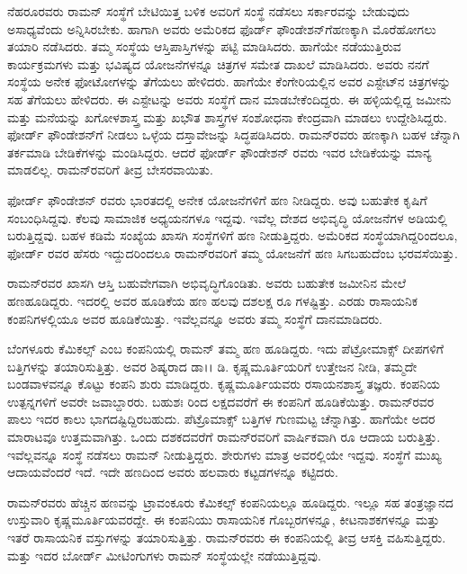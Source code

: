 \vskip 2pt

ನೆಹರೂರವರು ರಾಮನ್ ಸಂಸ್ಥೆಗೆ ಬೇಟಿಯಿತ್ತ ಬಳಿಕ ಅವರಿಗೆ ಸಂಸ್ಥೆ ನಡೆಸಲು ಸರ್ಕಾರವನ್ನು ಬೇಡುವುದು ಅಸಾಧ್ಯವೆಂದು ಅನ್ನಿಸಿರಬೇಕು. ಹಾಗಾಗಿ ಅವರು ಅಮೆರಿಕದ ಫೊರ್ಡ್ ಫೌಂಡೇಶನ್‌ಗೆ\break ಹಣಕ್ಕಾಗಿ ಮೊರೆಹೋಗಲು ತಯಾರಿ ನಡೆಸಿದರು. ತಮ್ಮ ಸಂಸ್ಥೆಯ ಆಸ್ತಿಪಾಸ್ತಿಗಳನ್ನು ಪಟ್ಟಿ ಮಾಡಿಸಿದರು. ಹಾಗೆಯೇ ನಡೆಯುತ್ತಿರುವ ಕಾರ್ಯಕ್ರಮಗಳು ಮತ್ತು ಭವಿಷ್ಯದ ಯೋಜನೆಗಳನ್ನೂ ಚಿತ್ರಗಳ ಸಮೇತ ದಾಖಲೆ ಮಾಡಿಸಿದರು. ಅವರು ನನಗೆ ಸಂಸ್ಥೆಯ ಅನೇಕ ಫೋಟೋಗಳನ್ನು ತೆಗೆಯಲು ಹೇಳಿದರು. ಹಾಗೆಯೇ ಕೆಂಗೇರಿಯಲ್ಲಿನ ಅವರ ಎಸ್ಟೇಟ್‍ನ ಚಿತ್ರಗಳನ್ನು ಸಹ ತೆಗೆಯಲು ಹೇಳಿದರು. ಈ ಎಸ್ಟೇಟನ್ನು ಅವರು ಸಂಸ್ಥೆಗೆ ದಾನ ಮಾಡಬೇಕೆಂದಿದ್ದರು. ಈ ಹಳ್ಳಿಯಲ್ಲಿದ್ದ ಜಮೀನು ಮತ್ತು ಮನೆಯನ್ನು ಖಗೋಳಶಾಸ್ತ್ರ ಮತ್ತು ಖಭೌತ ಶಾಸ್ತ್ರಗಳ ಸಂಶೋಧನಾ ಕೇಂದ್ರವಾಗಿ ಮಾಡಲು ಉದ್ದೇಶಿಸಿದ್ದರು. ಫೋರ್ಡ್ ಫೌಂಡೇಶನ್‍ಗೆ ನೀಡಲು ಒಳ್ಳೆಯ ದಸ್ತಾವೇಜನ್ನು ಸಿದ್ಧಪಡಿಸಿದರು. ರಾಮನ್‍ರವರು ಹಣಕ್ಕಾಗಿ ಬಹಳ ಚೆನ್ನಾಗಿ ತರ್ಕಮಾಡಿ ಬೇಡಿಕೆಗಳನ್ನು ಮಂಡಿಸಿದ್ದರು. ಆದರೆ ಫೋರ್ಡ್ ಫೌಂಡೇಶನ್ ರವರು ಇವರ ಬೇಡಿಕೆಯನ್ನು ಮಾನ್ಯ ಮಾಡಲಿಲ್ಲ. ರಾಮನ್‍ರವರಿಗೆ ತೀವ್ರ ಬೇಸರವಾಯಿತು.

\vskip 2pt

ಫೋರ್ಡ್ ಫೌಂಡೇಶನ್ ರವರು ಭಾರತದಲ್ಲಿ ಅನೇಕ ಯೋಜನೆಗಳಿಗೆ ಹಣ ನೀಡಿದ್ದರು. ಅವು ಬಹುತೇಕ ಕೃಷಿಗೆ ಸಂಬಂಧಿಸಿದ್ದವು. ಕೆಲವು ಸಾಮಾಜಿಕ ಅಧ್ಯಯನಗಳೂ ಇದ್ದವು. ಇವೆಲ್ಲ ದೇಶದ ಅಭಿವೃದ್ಧಿ ಯೋಜನೆಗಳ ಅಡಿಯಲ್ಲಿ ಬರುತ್ತಿದ್ದವು. ಬಹಳ ಕಡಿಮೆ ಸಂಖ್ಯೆಯ ಖಾಸಗಿ ಸಂಸ್ಥೆಗಳಿಗೆ ಹಣ ನೀಡುತ್ತಿದ್ದರು. ಅಮೆರಿಕದ ಸಂಸ್ಥೆಯಾಗಿದ್ದರಿಂದಲೂ, ಫೋರ್ಡ್ ರವರ ಹೆಸರು ಇದ್ದುದರಿಂದಲೂ ರಾಮನ್‍ರವರಿಗೆ ತಮ್ಮ ಯೋಜನೆಗೆ ಹಣ ಸಿಗಬಹುದೆಂಬ ಭರವಸೆಯಿತ್ತು.

ರಾಮನ್‍ರವರ ಖಾಸಗಿ ಆಸ್ತಿ ಬಹುವೇಗವಾಗಿ ಅಭಿವೃದ್ಧಿಗೊಂಡಿತು. ಅವರು ಬಹುತೇಕ ಜಮೀನಿನ ಮೇಲೆ ಹಣಹೂಡಿದ್ದರು. ಇದರಲ್ಲಿ ಅವರ ಹೂಡಿಕೆಯ ಹಣ ಹಲವು ದಶಲಕ್ಷ ರೂ ಗಳಷ್ಟಿತ್ತು. ಎರಡು ರಾಸಾಯನಿಕ ಕಂಪನಿಗಳಲ್ಲಿಯೂ ಅವರ ಹೂಡಿಕೆಯಿತ್ತು. ಇವೆಲ್ಲವನ್ನೂ ಅವರು ತಮ್ಮ ಸಂಸ್ಥೆಗೆ ದಾನಮಾಡಿದರು.

ಬೆಂಗಳೂರು ಕೆಮಿಕಲ್ಸ್ ಎಂಬ ಕಂಪನಿಯಲ್ಲಿ ರಾಮನ್ ತಮ್ಮ ಹಣ ಹೂಡಿದ್ದರು. ಇದು ಪೆಟ್ರೋಮಾಕ್ಸ್ ದೀಪಗಳಿಗೆ ಬತ್ತಿಗಳನ್ನು ತಯಾರಿಸುತ್ತಿತ್ತು. ಅವರ ಶಿಷ್ಯರಾದ ಡಾ।। ಡಿ. ಕೃಷ್ಣಮೂರ್ತಿ\break ಯರಿಗೆ ಉತ್ತೇಜನ ನೀಡಿ, ತಮ್ಮದೇ ಬಂಡವಾಳವನ್ನೂ ಕೊಟ್ಟು ಕಂಪನಿ ಶುರು ಮಾಡಿದ್ದರು. ಕೃಷ್ಣಮೂರ್ತಿ\-ಯವರು ರಸಾಯನಶಾಸ್ತ್ರ ತಜ್ಞರು. ಕಂಪನಿಯ ಉತ್ಪನ್ನಗಳಿಗೆ ಅವರೇ ಜವಾಬ್ದಾರರು. ಬಹುಶಃ  ರಿಂದ  ಲಕ್ಷದವರೆಗೆ ಈ ಕಂಪನಿಗೆ ಹೂಡಿಕೆಯಿತ್ತು. ರಾಮನ್‍ರವರ ಪಾಲು ಇದರ ಕಾಲು ಭಾಗದಷ್ಟಿದ್ದಿರಬಹುದು. ಪೆಟ್ರೊಮಾಕ್ಸ್ ಬತ್ತಿಗಳ ಗುಣಮಟ್ಟ ಚೆನ್ನಾಗಿತ್ತು. ಹಾಗೆಯೇ ಅದರ ಮಾರಾಟವೂ ಉತ್ತಮವಾಗಿತ್ತು. ಒಂದು ದಶಕದವರೆಗೆ ರಾಮನ್‍ರವರಿಗೆ ವಾರ್ಷಿಕವಾಗಿ  ರೂ ಆದಾಯ ಬರುತ್ತಿತ್ತು. ಇವೆಲ್ಲವನ್ನೂ ಸಂಸ್ಥೆ ನಡೆಸಲು ರಾಮನ್ ನೀಡುತ್ತಿದ್ದರು. ಶೇರುಗಳು ಮಾತ್ರ ಅವರಲ್ಲಿಯೇ ಇದ್ದವು. ಸಂಸ್ಥೆಗೆ ಮುಖ್ಯ ಆದಾಯವೆಂದರೆ ಇದೆ. ಇದೇ ಹಣದಿಂದ ಅವರು ಹಲವಾರು ಕಟ್ಟಡಗಳನ್ನೂ ಕಟ್ಟಿದರು.

ರಾಮನ್‍ರವರು ಹೆಚ್ಚಿನ ಹಣವನ್ನು ಟ್ರಾವಂಕೂರು ಕೆಮಿಕಲ್ಸ್ ಕಂಪನಿಯಲ್ಲೂ ಹೂಡಿದ್ದರು. ಇಲ್ಲೂ ಸಹ ತಂತ್ರಜ್ಞಾನದ ಉಸ್ತುವಾರಿ ಕೃಷ್ಣಮೂರ್ತಿಯವರದ್ದೇ. ಈ ಕಂಪನಿಯು ರಾಸಾಯನಿಕ ಗೊಬ್ಬರಗಳನ್ನೂ, ಕೀಟನಾಶಕಗಳನ್ನೂ ಮತ್ತು ಇತರೆ ರಾಸಾಯನಿಕ ವಸ್ತುಗಳನ್ನು ತಯಾರಿಸುತ್ತಿತ್ತು. ರಾಮನ್‍ರವರು ಈ ಕಂಪನಿಯಲ್ಲಿ ತೀವ್ರ ಆಸಕ್ತಿ ವಹಿಸುತ್ತಿದ್ದರು. ಮತ್ತು ಇದರ ಬೋರ್ಡ್ ಮೀಟಿಂಗುಗಳು ರಾಮನ್ ಸಂಸ್ಥೆಯಲ್ಲೇ ನಡೆಯುತ್ತಿದ್ದವು.


